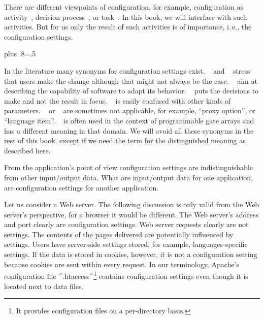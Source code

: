 There are different viewpoints of configuration, for example, configuration as activity~\cite{sabin1998product}, decision process~\cite{reiser2009cvm}, or task~\cite{soininen1998towards}.
In this book, we will interface with such activities.
But for us only the result of such activities is of importance, i.\,e., the configuration settings.%
{\parfillskip=0pt plus .8\textwidth \emergencystretch=.5\textwidth \par}

In the literature many synonyms for configuration settings exist.
~\cite{jin2014configurations} and ~\cite{anderson2002researching} stress that users make the change although that might not always be the case.
~\cite{gunther2012software,rhein2016variability,villela2014survey,van2001notion,nadi2014mining,mens2016taxonomy} aim at describing the capability of software to adapt its behavior.
~\cite{software1993reuse,czarnecki2012cool} puts the decisions to make and not the result in focus.
~\cite{yin2011empirical,anderson1994towards} is easily confused with other kinds of parameters.
~\cite{anthony2009context} or ~\cite{rabkin2011static,zhang2013automated,zhang2014configuration} are sometimes not applicable, for example, ``proxy option'', or ``language item''.
~\cite{huang2015confvalley} is often used in the context of programmable gate arrays and has a different meaning in that domain.
We will avoid all these synonyms in the rest of this book, except if we need the term for the distinguished meaning as described here.

From the application's point of view configuration settings are indistinguishable from other input/output data.
What are input/output data for one application, are configuration settings for another application.
\begin{example}
Let us consider a Web server.
The following discussion is only valid from the Web server's perspective, for a browser it would be different.
The Web server's address and port clearly are configuration settings.
Web server requests clearly are not settings.
The contents of the pages delivered are potentially influenced by settings.
Users have server-side settings stored, for example, languages-specific settings.
If the data is stored in cookies, however, it is not a configuration setting because cookies are sent within every request.
In our terminology, Apache's configuration file ^.htaccess^\footnote{It provides configuration files on a per-directory basis.} contains configuration settings even though it is located next to data files.
\end{example}



